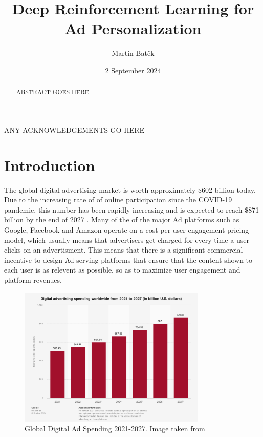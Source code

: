 \documentclass{mldsmsc}
\title{Deep Reinforcement Learning for Ad Personalization}
\author{Martin Bat\v{e}k}
\date{2 September 2024}
\begin{document}
\maketitle


\declaration 


\begin{abstract}
    ABSTRACT GOES HERE
\end{abstract}

\begin{acknowledgements}
    ANY ACKNOWLEDGEMENTS GO HERE
\end{acknowledgements}


\tableofcontents

\mainmatter


\chapter{Introduction}

The global digital advertising market is worth approximately \$602 billion today. Due to the increasing rate of of online participation since the 
COVID-19 pandemic, this number has been rapidly increasing and is expected to reach \$871 billion by the end of 2027 \citep{RefWorks:emarketer2023digital}.
Many of the of the major Ad platforms such as Google, Facebook and Amazon operate on a cost-per-user-engagement pricing model, which usually means that 
advertisers get charged for every time a user clicks on an advertisment. This means that there is
a significant commercial incentive to design Ad-serving platforms that ensure that the content 
shown to each user is as relevent as possible, so as to maximize user engagement and platform revenues.

\begin{figure}[h]
\centering
\includegraphics[width=0.8\textwidth]{../figures/eMarketer - Ad Spending.png}
\caption{Global Digital Ad Spending 2021-2027. Image taken from \cite{RefWorks:emarketer2023digital}}
\label{fig:ad-spending}
\end{figure}
\end{document}
